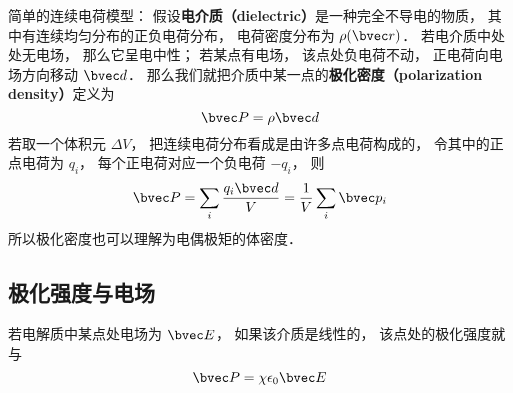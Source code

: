 

简单的连续电荷模型： 假设\textbf{电介质（dielectric）}是一种完全不导电的物质， 其中有连续均匀分布的正负电荷分布， 电荷密度分布为 $\rho(\bvec r)$． 若电介质中处处无电场， 那么它呈电中性； 若某点有电场， 该点处负电荷不动， 正电荷向电场方向移动 $\bvec d$． 那么我们就把介质中某一点的\textbf{极化密度（polarization density）}定义为
\begin{equation}
\bvec P = \rho \bvec d
\end{equation}
若取一个体积元 $\Delta V$， 把连续电荷分布看成是由许多点电荷构成的， 令其中的正点电荷为 $q_i$， 每个正电荷对应一个负电荷 $-q_i$， 则
\begin{equation}
\bvec P = \sum_i \frac{q_i\bvec d}{V} = \frac{1}{V} \sum_i \bvec p_i
\end{equation}
所以极化密度也可以理解为电偶极矩的体密度．

\subsection{极化强度与电场}
若电解质中某点处电场为 $\bvec E$， 如果该介质是线性的， 该点处的极化强度就与
\begin{equation}
\bvec P = \chi \epsilon_0 \bvec E
\end{equation}
